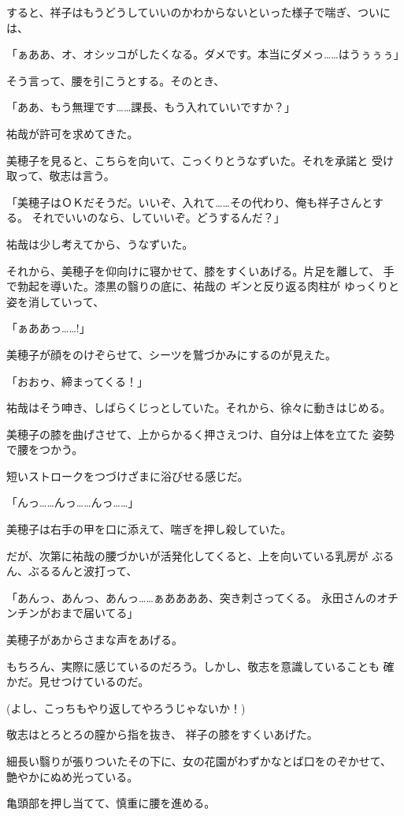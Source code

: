 ﻿\documentclass[
    book,tate,
    line_length=30zw,
    jafontsize=12pt,
    paper=b5j,
    landscape,
    ]{jlreq}
\begin{document}
すると、祥子はもうどうしていいのかわからないといった様子で喘ぎ、ついには、

「ぁああ、オ、オシッコがしたくなる。ダメです。本当にダメっ……はうぅぅぅ」

そう言って、腰を引こうとする。そのとき、

「ああ、もう無理です……課長、もう入れていいですか？」

祐哉が許可を求めてきた。

美穂子を見ると、こちらを向いて、こっくりとうなずいた。それを承諾と
受け取って、敬志は言う。

「美穂子はＯＫだそうだ。いいぞ、入れて……その代わり、俺も祥子さんとする。
それでいいのなら、していいぞ。どうするんだ？」

祐哉は少し考えてから、うなずいた。

それから、美穂子を仰向けに寝かせて、膝をすくいあげる。片足を離して、
手で勃起を導いた。漆黒の翳りの底に、祐哉の ギンと反り返る肉柱が
ゆっくりと姿を消していって、

「ぁああっ……!」

美穂子が顔をのけぞらせて、シーツを鷲づかみにするのが見えた。

「おおゥ、締まってくる！」

祐哉はそう呻き、しばらくじっとしていた。それから、徐々に動きはじめる。

美穂子の膝を曲げさせて、上からかるく押さえつけ、自分は上体を立てた
姿勢で腰をつかう。

短いストロークをつづけざまに浴びせる感じだ。

「んっ……んっ……んっ……」

美穂子は右手の甲を口に添えて、喘ぎを押し殺していた。

だが、次第に祐哉の腰づかいが活発化してくると、上を向いている乳房が
ぶるん、ぶるるんと波打って、 

「あんっ、あんっ、あんっ……ぁああああ、突き刺さってくる。 
永田さんのオチンチンがおまで届いてる」 

美穂子があからさまな声をあげる。

もちろん、実際に感じているのだろう。しかし、敬志を意識していることも
確かだ。見せつけているのだ。

(よし、こっちもやり返してやろうじゃないか！)

敬志はとろとろの膣から指を抜き、 祥子の膝をすくいあげた。

細長い翳りが張りついたその下に、女の花園がわずかなとば口をのぞかせて、
艶やかにぬめ光っている。

亀頭部を押し当てて、慎重に腰を進める。
\end{document}
